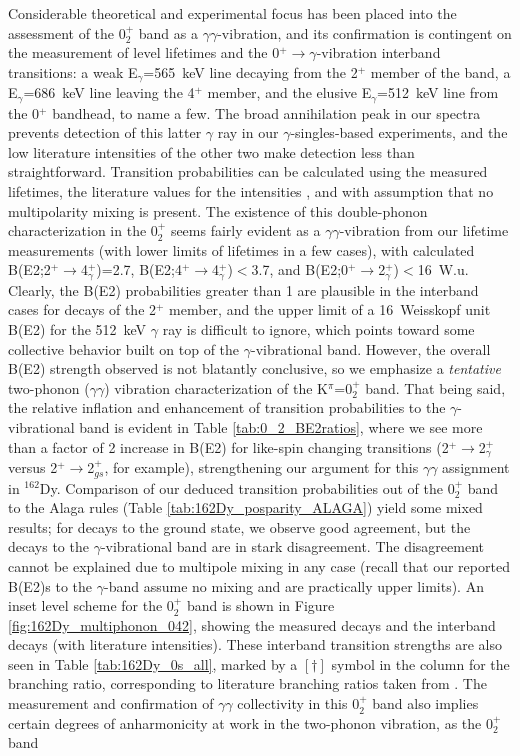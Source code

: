 Considerable theoretical and experimental focus \cite{Meyer_pt0_2006,Zamfir_162Dy0_1999,PhysRevC.54.679,BERZINS1995413} has been placed into the assessment of the 0$^+_2$ band as a $\gamma\gamma$-vibration, and its confirmation is contingent on the measurement of level lifetimes and the 0$^+\rightarrow\gamma$-vibration interband transitions: a weak E$_\gamma$=565~keV line decaying from the 2$^+$ member of the band, a E$_\gamma$=686~keV line leaving the 4$^+$ member, and the elusive E$_\gamma$=512~keV line from the 0$^+$ bandhead, to name a few. The broad annihilation peak in our spectra prevents detection of this latter $\gamma$ ray in our $\gamma$-singles-based experiments, and the low literature intensities of the other two make detection less than straightforward. Transition probabilities can be calculated using the measured lifetimes, the literature values for the intensities \cite{Aprahamian200642,Zamfir_162Dy0_1999}, and with assumption that no multipolarity mixing is present. The existence of this double-phonon characterization in the 0$^+_2$ seems fairly evident as a $\gamma\gamma$-vibration from our lifetime measurements (with lower limits of lifetimes in a few cases), with calculated B(E2;2$^+\rightarrow$4$^+_\gamma$)=2.7, B(E2;4$^+\rightarrow$4$^+_\gamma$)$<$3.7, and B(E2;0$^+\rightarrow$2$^+_\gamma$)$<$16~W.u. Clearly, the B(E2) probabilities greater than 1 are plausible in the interband cases for decays of the 2$^+$ member, and the upper limit of a 16~Weisskopf unit B(E2) for the 512~keV $\gamma$ ray is difficult to ignore, which points toward some collective behavior built on top of the $\gamma$-vibrational band. However, the overall B(E2) strength observed is not blatantly conclusive, so we emphasize a \textit{tentative} two-phonon ($\gamma\gamma$) vibration characterization of the K$^\pi$=0$^+_2$ band. That being said, the relative inflation and enhancement of transition probabilities to the $\gamma$-vibrational band is evident in Table \ref{tab:0_2_BE2ratios}, where we see more than a factor of 2 increase in B(E2) for like-spin changing transitions (2$^+\rightarrow$2$^+_\gamma$ versus 2$^+\rightarrow$2$^+_{gs}$, for example), strengthening our argument for this $\gamma\gamma$ assignment in $^{162}$Dy. Comparison of our deduced transition probabilities out of the 0$^+_2$ band to the Alaga rules (Table \ref{tab:162Dy_posparity_ALAGA}) yield some mixed results; for decays to the ground state, we observe good agreement, but the decays to the $\gamma$-vibrational band are in stark disagreement. The disagreement cannot be explained due to multipole mixing in any case (recall that our reported B(E2)s to the $\gamma$-band assume no mixing and are practically upper limits). An inset level scheme for the 0$^+_2$ band is shown in Figure \ref{fig:162Dy_multiphonon_042}, showing the measured decays and the interband decays (with literature intensities). These interband transition strengths are also seen in Table \ref{tab:162Dy_0s_all}, marked by a ${[\dagger]}$ symbol in the column for the branching ratio, corresponding to literature branching ratios taken from \cite{Aprahamian200642}. The measurement and confirmation of $\gamma\gamma$ collectivity in this 0$^+_2$ band also implies certain degrees of anharmonicity at work in the two-phonon vibration, as the 0$^+_2$ band 